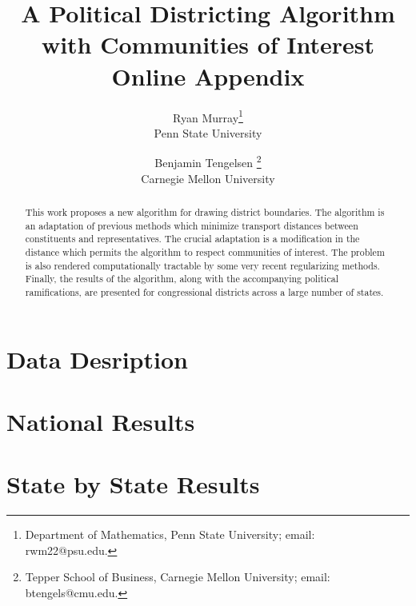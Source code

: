 \documentclass[11pt]{article}
\theoremstyle{definition}
\numberwithin{equation}{section}
\begin{document}
\title{A Political Districting Algorithm with Communities of Interest\\
Online Appendix }
\author{Ryan Murray\thanks{Department of Mathematics,
Penn State University; email: rwm22@psu.edu.} \\
Penn State University  \\
\and Benjamin Tengelsen \thanks{Tepper School of Business, 
Carnegie Mellon University; email: btengels@cmu.edu.} \\
Carnegie Mellon University }
\maketitle


\begin{abstract}
This work proposes a new algorithm for drawing district boundaries. The algorithm is an adaptation of previous methods which minimize transport distances between constituents and representatives. The crucial adaptation is a modification in the distance which permits the algorithm to respect communities of interest. The problem is also rendered computationally tractable by some very recent regularizing methods. Finally, the results of the algorithm, along with the accompanying political ramifications, are presented for congressional districts across a large number of states.
\end{abstract}

\newpage{} \onehalfspacing
\tableofcontents

\newpage
\section{Data Desription }


\newpage
\section{National Results }



\newpage
\section{State by State Results }

\end{document}
